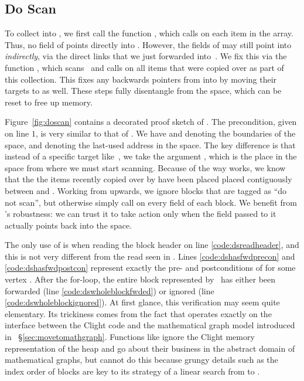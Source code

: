 \subsection{Do Scan}

To collect  into , 
we first call the function , which calls  
on each item in the  array. 
Thus, no field of  points directly into . 
However, the fields of  may still point into  \emph{indirectly}, 
via the direct links that we just forwarded into~.
We fix this via the function 
, which scans~ and calls 
 on all items that were copied over as part of this collection.
This fixes any backwards pointers from  into  by moving
their targets to  as well.
These steps fully disentangle  from the 
 space, which can be reset to free up memory. 



Figure~\ref{fig:doscan} contains a decorated proof sketch of .
The precondition, given on line $1$, is very similar to that of 
. We have  and  denoting the boundaries
of the  space, and  denoting the last-used address
in the  space. The key difference is that instead of a specific
target like~, we take the argument , 
which is the place in the  space from where we must start scanning.
Because of the way  works, we know that the 
the items recently copied over by  
have been placed placed contiguously between  and . 
Working from  upwards, we ignore blocks that are tagged as 
``do not scan'', but otherwise simply call  on every field
of each block. We benefit from 's robustness: we can trust it to 
take action only when the field passed to it actually points back into the 
 space. 

The only use of  is when
reading the block header on line \ref{code:dsreadheader}, 
and this is not very different from the read seen in . 
Lines \ref{code:dshasfwdprecon} and \ref{code:dshasfwdpostcon} 
represent exactly the pre- and postconditions of 
for some vertex . 
After the for-loop, the entire block represented by~ has either been
forwarded (line \ref{code:dswholeblockfwded}) or 
ignored (line \ref{code:dswholeblockignored}). 
At first glance, this verification may seem quite elementary. 
Its trickiness comes from the fact
that  operates exactly on the interface between the Clight code 
and the mathematical graph model introduced in ~\S\ref{sec:movetomathgraph}.
Functions like  ignore the Clight memory representation 
of the heap and go about their business in the abstract domain
of mathematical graphs, but  cannot do this because grungy 
details such as the index order of blocks are key to its strategy of a
linear search from  to .

